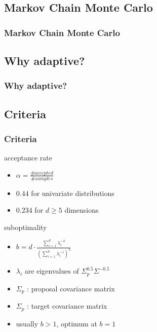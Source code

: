 

\subsection{Markov Chain Monte Carlo}
\begin{frame}
\frametitle{Markov Chain Monte Carlo}

\end{frame}


\subsection{Why adaptive?}
\begin{frame}
\frametitle{Why adaptive?}

\end{frame}


\subsection{Criteria}
\begin{frame}
\frametitle{Criteria}
\begin{block}{acceptance rate}
\begin{itemize}
  \item $\alpha = \frac{\# accepted}{\# samples}$
  \item $0.44$ for univariate distributions
  \item $0.234$ for $d\geq 5$ dimensions
\end{itemize}

\end{block}
\begin{block}{suboptimality}
\begin{itemize}
  \item $b = d\cdot \frac{\sum_{i=1}^d \lambda_i^{-2}}{(\sum_{i=1}^d
  \lambda_i^{-1})^2}$
  \item $\lambda_i$ are eigenvalues of $\Sigma_p^{0.5}\Sigma^{-0.5}$
  \item $\Sigma_p$ : proposal covariance matrix
  \item $\Sigma_p$ : target covariance matrix
  \item usually $b>1$, optimum at $b=1$
\end{itemize}

\end{block}
\end{frame}

